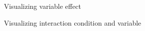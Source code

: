 \documentclass{article}
\begin{document}
\begin{figure}[H]
  \caption{Visualizing variable effect}
  \noindent{}
  \centering
\end{figure}

\begin{figure}[H]
  \caption{Visualizing interaction condition and variable}
  \noindent{}
  \centering
\end{figure}
\end{document}
